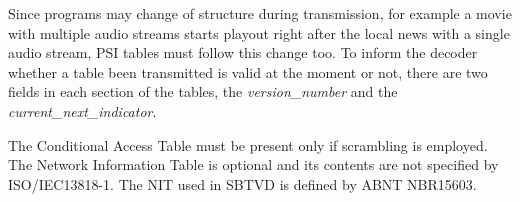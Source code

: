 \documentclass[
	12pt,				%
	openright,			%
	twoside,			%
	a4paper,			%
	brazil,
	french,				%
	english
	]{abntex2}
\begin{document}
Since programs may change of structure during transmission, for example a movie with multiple audio streams starts playout right after the local news with a single audio stream, PSI tables must follow this change too. To inform the decoder whether a table been transmitted is valid at the moment or not, there are two fields in each section of the tables, the \textit{version\hspace{0.1mm}\_\hspace{0.1mm}number} and the \textit{current\hspace{0.1mm}\_\hspace{0.1mm}next\hspace{0.1mm}\_\hspace{0.1mm}indicator}.

The Conditional Access Table must be present only if scrambling is employed. The Network Information Table is optional and its contents are not specified by ISO/IEC13818-1. The NIT used in SBTVD is defined by ABNT NBR15603.
\end{document}
